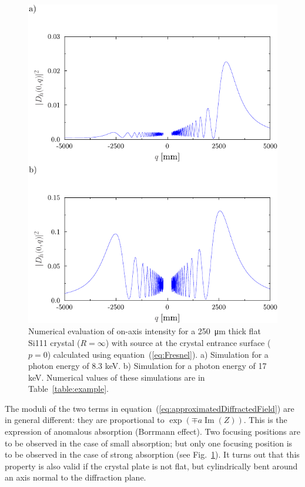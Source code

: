 \documentclass[preprint]{iucr}              %
\newcommand{\todo}[1]{{\color{red}[TODO: "#1'']}}
\begin{document}
\begin{figure}
\label{fig:flatLaue}
\caption{Numerical evaluation of on-axis intensity for a  \SI{250}{\micro\meter} thick flat Si111 crystal ($R=\infty$) with source at the crystal entrance surface ($p=0$) calculated using equation~(\ref{eq:Fresnel}).
a) Simulation for a photon energy of 8.3 keV.
b) Simulation for a photon energy of 17 keV.
Numerical values of these simulations are in Table~\ref{table:example}.
}
\includegraphics[width=1\textwidth]{fig4.pdf}
\end{figure}

The moduli of the two terms in equation~(\ref{eq:approximatedDiffractedField}) are in general different: they are proportional to $\exp(\mp a \operatorname{Im}(Z))$. This is the expression of anomalous absorption (Borrmann effect). Two focusing positions are to be observed in the case of small absorption; but only one focusing position is to be observed in the case of strong absorption (see Fig.~\ref{fig:flatLaue}). It turns out that this property is also valid if the crystal plate is not flat, but cylindrically bent around an axis normal to the diffraction plane. 
\end{document}

